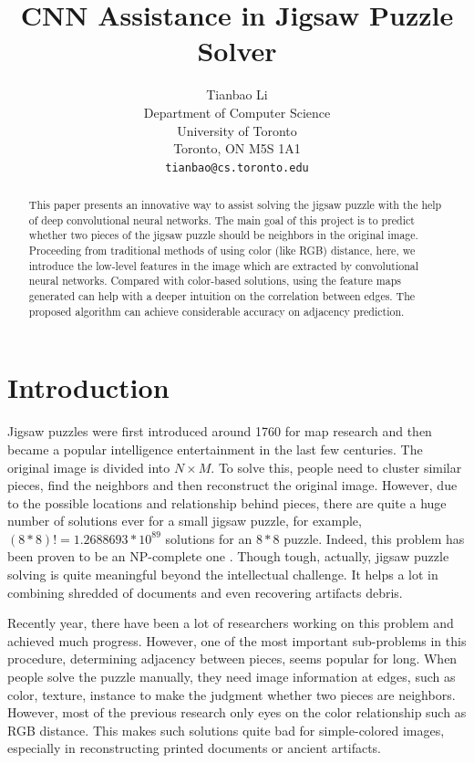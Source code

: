 \documentclass{article}
\title{CNN Assistance in Jigsaw Puzzle Solver}
\author{Tianbao Li\\
  Department of Computer Science\\
  University of Toronto\\
  Toronto, ON M5S 1A1 \\
  \texttt{tianbao@cs.toronto.edu} \\
}
\begin{document}

\maketitle

\begin{abstract}

This paper presents an innovative way to assist solving the jigsaw puzzle with the help of deep convolutional neural networks. The main goal of this project is to predict whether two pieces of the jigsaw puzzle should be neighbors in the original image. Proceeding from traditional methods of using color (like RGB) distance, here, we introduce the low-level features in the image which are extracted by convolutional neural networks. Compared with color-based solutions, using the feature maps generated can help with a deeper intuition on the correlation between edges. The proposed algorithm can achieve considerable accuracy on adjacency prediction.

\end{abstract}

\section{Introduction}

Jigsaw puzzles were first introduced around 1760 for map research and then became a popular intelligence entertainment \cite{freeman1964apictorial} in the last few centuries. The original image is divided into $N\times M$. To solve this, people need to cluster similar pieces, find the neighbors and then reconstruct the original image. However, due to the possible locations and relationship behind pieces, there are quite a huge number of solutions ever for a small jigsaw puzzle, for example, $(8*8)!=1.2688693*10^{89}$ solutions for an $8*8$ puzzle. Indeed, this problem has been proven to be an NP-complete one \cite{altman1989solving,demaine2007jigsaw}. Though tough, actually, jigsaw puzzle solving is quite meaningful beyond the intellectual challenge. It helps a lot in combining shredded of documents \cite{levin1975computer,marques2009reconstructing} and even recovering artifacts debris\cite{koller2006computer}.

Recently year, there have been a lot of researchers working on this problem and achieved much progress. However, one of the most important sub-problems in this procedure, determining adjacency between pieces, seems popular for long. When people solve the puzzle manually, they need image information at edges, such as color, texture, instance to make the judgment whether two pieces are neighbors. However, most of the previous research only eyes on the color relationship such as RGB distance. This makes such solutions quite bad for simple-colored images, especially in reconstructing printed documents or ancient artifacts.
\end{document}
